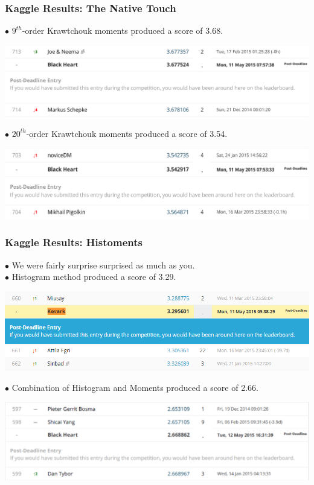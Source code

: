 \documentclass{beamer}
\begin{document}
\begin{frame}
	\frametitle{Kaggle Results: The Native Touch}
$\bullet$ $9^{th}$-order Krawtchouk moments produced a score of 3.68. \\
\begin{center}
	\includegraphics[scale=0.3]{9moments.png}
\end{center}
$\bullet$ $20^{th}$-order Krawtchouk moments produced a score of 3.54. \\
\begin{center}
	\includegraphics[scale=0.3]{20moments.png}
\end{center}
\end{frame}



\begin{frame}
	\frametitle{Kaggle Results: Histoments}
$\bullet$ We were fairly surprise surprised as much as you.\\
$\bullet$ Histogram method produced a score of 3.29. \\
\begin{center}
	\includegraphics[scale=0.3]{submission.png}
\end{center}
$\bullet$ Combination of Histogram and Moments produced a score of 2.66. \\
\begin{center}
	\includegraphics[scale=0.25]{combined.png}
\end{center}
\end{frame}
\end{document}
